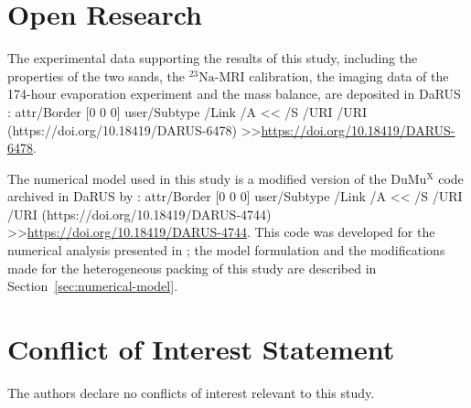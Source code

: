 \documentclass[final]{agujournal2019}
\newcommand{\repositoryurl}[1]{\leavevmode\pdfstartlink attr{/Border [0 0 0]}
  user{/Subtype /Link /A << /S /URI /URI (#1) >>}\url{#1}\pdfendlink}
\newcommand{\NaIso}{\ensuremath{^{23}\mathrm{Na}}}
\begin{document}
\section*{Open Research}
The experimental data supporting the results of this study, including the
properties of the two sands, the \NaIso-MRI calibration, the imaging data of the
174-hour evaporation experiment and the mass balance, are deposited in DaRUS
\cite{chaudhry2026data}:
\repositoryurl{https://doi.org/10.18419/DARUS-6478}.

The numerical model used in this study is a modified version of the
DuMu$^\mathrm{X}$ code archived in DaRUS by :
\repositoryurl{https://doi.org/10.18419/DARUS-4744}. This code was developed for
the numerical analysis presented in ; the model formulation
and the modifications made for the heterogeneous packing of this study are
described in Section~\ref{sec:numerical-model}.

\section*{Conflict of Interest Statement}
The authors declare no conflicts of interest relevant to this study.


\end{document}
